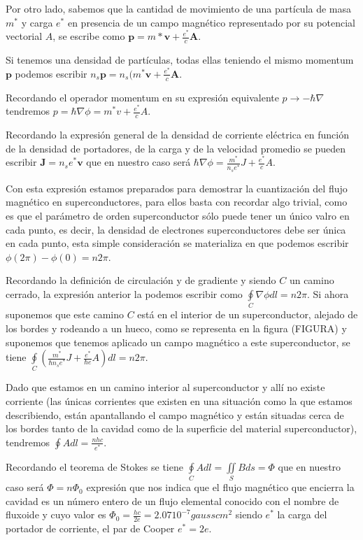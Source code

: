 Por otro lado, sabemos que la cantidad de movimiento de una partícula de masa $m^*$ y carga $e^*$ en presencia de un campo magnético representado por su potencial vectorial $A$, se escribe como $\mathbf{p} = m* \mathbf{v} + \frac{e^*}{c} \mathbf{A}$.

Si tenemos una densidad de partículas, todas ellas teniendo el mismo momentum $\mathbf{p}$ podemos escribir $n_s \mathbf{p} = n_s (m^* \mathbf{v} + \frac{e^*}{c} \mathbf{A}$.

Recordando el operador momentum en su expresión equivalente $p \rightarrow -\hbar \nabla$ tendremos $p = \hbar \nabla \phi = m^* v + \frac{e^*}{c} A$.

Recordando la expresión general de la densidad de corriente eléctrica en función de la densidad de portadores, de la carga y de la velocidad promedio se pueden escribir $\mathbf{J} = n_s e^* \mathbf{v}$ que en nuestro caso será $\hbar \nabla \phi = \frac{m^*}{n_s e^*} J + \frac{e^*}{c} A$.

Con esta expresión estamos preparados para demostrar la cuantización del flujo magnético en superconductores, para ellos basta con recordar algo trivial, como es que el parámetro de orden superconductor sólo puede tener un único valro en cada punto, es decir, la densidad de electrones superconductores debe ser única en cada punto, esta simple consideración se materializa en que podemos escribir $\phi(2\pi) - \phi(0) = n 2 \pi$.

Recordando la definición de circulación y de gradiente y siendo $C$ un camino cerrado, la expresión anterior la podemos escribir como $\oint\limits_C \nabla \phi dl = n 2 \pi$. Si ahora suponemos que este camino $C$ está en el interior de un superconductor, alejado de los bordes y rodeando a un hueco, como se representa en la figura (FIGURA) y suponemos que tenemos aplicado un campo magnético a este superconductor, se tiene $\oint\limits_C (\frac{m^*}{\hbar n_s e^*} J + \frac{e^*}{\hbar e} A) dl = n 2 \pi$.

Dado que estamos en un camino interior al superconductor y allí no existe corriente (las únicas corrientes que existen en una situación como la que estamos describiendo, están apantallando el campo magnético y están situadas cerca de los bordes tanto de la cavidad como de la superficie del material superconductor), tendremos $\oint A dl = \frac{n h c}{e^*}$.

Recordando el teorema de Stokes se tiene $\oint\limits_C A dl = \iint\limits_S B ds = \Phi$ que en nuestro caso será $\Phi = n \Phi_0$ expresión que nos indica que el flujo magnético que encierra la cavidad es un número entero de un flujo elemental conocido con el nombre de fluxoide y cuyo valor es $\Phi_0 = \frac{h c}{2 e} = 2.07 10^{-7} gauss cm^2$ siendo $e^*$ la carga del portador de corriente, el par de Cooper $e^* = 2e$.

